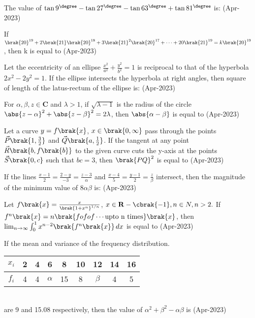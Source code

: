 \iffalse
\title{Assignment}
\author{EE24BTECH11047}
\section{integer}
\fi
\item The value of $\tan{9}^{\degree}-\tan{27}^{\degree}-\tan{63}^{\degree}+\tan{81}^{\degree}$ is: \hfill(Apr-2023)
\item If $\brak{20}^{19}+2\brak{21}\brak{20}^{18}+3\brak{21}^{2}\brak{20}^{17}+\cdots+20\brak{21}^{19}=k\brak{20}^{19}$, then k is equal to \hfill(Apr-2023)

\item Let the eccentricity of an ellipse $\frac{x^2}{a^2}+\frac{y^2}{b^2}=1$ is reciprocal to that of the hyperbola $2x^2-2y^2=1$. If the ellipse intersects the hyperbola at right angles, then square of length of the latus-rectum of the ellipse is: \hfill(Apr-2023)

\item For $\alpha,\beta,z\in\mathbf{C}$ and $\lambda>1$, if $\sqrt{\lambda-1}$ is the radius of the circle $\abs{z-\alpha}^2+\abs{z-\beta}^2=2\lambda$, then $\abs{\alpha-\beta}$ is equal to \hfill(Apr-2023)

\item Let a curve $y = f\brak{x}$,  $x\in\brak{0,\infty}$ pass through the points $\vec{P}\brak{1,\frac{3}{2}}$ and $\vec{Q}\brak{a,\frac{1}{2}}$. If the tangent at any point $\vec{R}\brak{b,f\brak{b}}$ to the given curve cuts the y-axis at the points $\vec{S}\brak{0,c}$ such that $bc=3$, then $\brak{PQ}^2$ is equal to \hfill(Apr-2023)

\item If the lines $\frac{x-1}{2} = \frac{2 - y}{-3} = \frac{z - 3}{\alpha}$ and $\frac{x - 4}{5} = \frac{y - 1}{2} = \frac{z}{\beta}$ intersect, then the magnitude of the minimum value of $8 \alpha \beta$ is: \hfill(Apr-2023)

\item Let $f\brak{x}=\frac{x}{\brak{1+x^{n}}^{1/n}}$, $x\in\mathbf{R}-\cbrak{-1},n\in N,n>2.$ If $f^n\brak{x}=n\brak{fofof\cdots \text{upto n times}}\brak{x}$, then\\
    $\lim_{n\to\infty}\int_{0}^{1} x^{n-2}\brak{f^n\brak{x}} \,dx$ is equal to \hfill(Apr-2023)

\item If the mean and variance of the frequency distribution. \\
    \begin{tabular}{|c|c|c|c|c|c|c|c|c|} 
        \hline
            $x_i$ & 2 & 4 & 6 & 8 & 10 & 12 & 14 & 16 \\ 
        \hline
            $f_i$ & 4 & 4 & $\alpha$ & 15 & 8 & $\beta$ & 4 & 5 \\ 
        \hline
    \end{tabular}\\
    are 9 and 15.08 respectively, then the  value of $\alpha^2+\beta^2-\alpha\beta$ is \hfill(Apr-2023)

